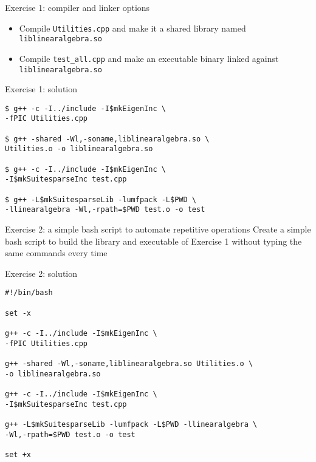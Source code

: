 \documentclass[10pt]{beamer}
\begin{document}
\begin{frame}{Exercise 1: compiler and linker options}
\begin{itemize}
\item Compile {\tt Utilities.cpp} and make it a shared library named {\tt liblinearalgebra.so}\\[5mm]
\item Compile {\tt test\_all.cpp} and make an executable binary linked against {\tt liblinearalgebra.so}
\end{itemize}
\end{frame}

\begin{frame}[fragile]{Exercise 1: solution}
\begin{verbatim}
$ g++ -c -I../include -I$mkEigenInc \
-fPIC Utilities.cpp

$ g++ -shared -Wl,-soname,liblinearalgebra.so \
Utilities.o -o liblinearalgebra.so

$ g++ -c -I../include -I$mkEigenInc \
-I$mkSuitesparseInc test.cpp

$ g++ -L$mkSuitesparseLib -lumfpack -L$PWD \
-llinearalgebra -Wl,-rpath=$PWD test.o -o test

\end{verbatim}


\end{frame}



\begin{frame}{Exercise 2: a simple bash script to automate repetitive operations}
Create a simple bash script to build the library and executable of Exercise 1 without typing the same commands every time
\end{frame}

\begin{frame}[fragile]{Exercise 2: solution}
\begin{verbatim}
#!/bin/bash

set -x

g++ -c -I../include -I$mkEigenInc \
-fPIC Utilities.cpp

g++ -shared -Wl,-soname,liblinearalgebra.so Utilities.o \
-o liblinearalgebra.so

g++ -c -I../include -I$mkEigenInc \
-I$mkSuitesparseInc test.cpp

g++ -L$mkSuitesparseLib -lumfpack -L$PWD -llinearalgebra \
-Wl,-rpath=$PWD test.o -o test

set +x
\end{verbatim}
\end{frame}
\end{document}
